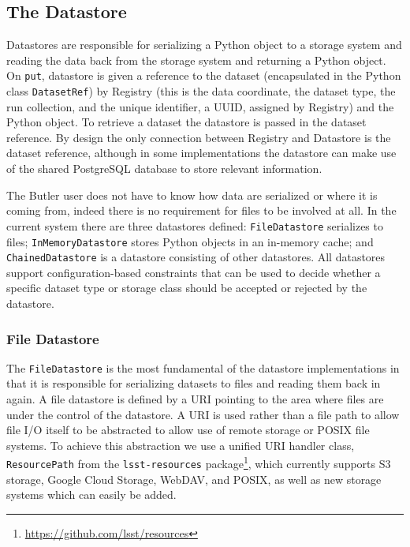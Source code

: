 \documentclass[]{spie}
\begin{document}
\subsection{The Datastore}

Datastores are responsible for serializing a Python object to a storage system and reading the data back from the storage system and returning a Python object.
On \texttt{put}, datastore is given a reference to the dataset (encapsulated in the Python class \texttt{DatasetRef}) by Registry (this is the data coordinate, the dataset type, the run collection, and the unique identifier, a UUID,\cite{rfc4122uuid} assigned by Registry) and the Python object.
To retrieve a dataset the datastore is passed in the dataset reference.
By design the only connection between Registry and Datastore is the dataset reference, although in some implementations the datastore can make use of the shared PostgreSQL database to store relevant information.

The Butler user does not have to know how data are serialized or where it is coming from, indeed there is no requirement for files to be involved at all.
In the current system there are three datastores defined: \texttt{FileDatastore} serializes to files; \texttt{InMemoryDatastore} stores Python objects in an in-memory cache; and \texttt{ChainedDatastore} is a datastore consisting of other datastores.
All datastores support configuration-based constraints that can be used to decide whether a specific dataset type or storage class should be accepted or rejected by the datastore.

\subsubsection{File Datastore}

The \texttt{FileDatastore} is the most fundamental of the datastore implementations in that it is responsible for serializing datasets to files and reading them back in again.
A file datastore is defined by a URI pointing to the area where files are under the control of the datastore.
A URI is used rather than a file path to allow file I/O itself to be abstracted to allow use of remote storage or POSIX file systems.
To achieve this abstraction we use a unified URI handler class, \texttt{ResourcePath} from the \texttt{lsst-resources} package\footnote{\url{https://github.com/lsst/resources}}, which currently supports S3 storage, Google Cloud Storage, WebDAV, and POSIX, as well as new storage systems which can easily be added.
\end{document}
